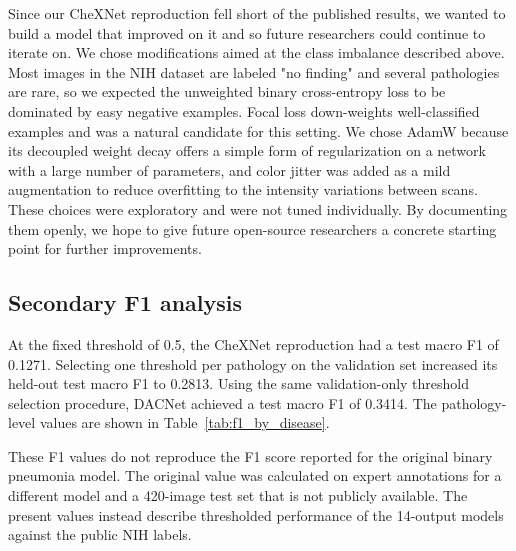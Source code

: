 Since our CheXNet reproduction fell short of the published results, we
wanted to build a model that improved on it and so future researchers
could continue to iterate on. We chose modifications aimed at the class
imbalance described above. Most images in the NIH dataset are labeled "no finding" 
and several pathologies are rare, so we expected the unweighted binary cross-entropy
loss to be dominated by easy negative examples. Focal loss down-weights
well-classified examples and was a natural candidate for this setting. We
chose AdamW because its decoupled weight decay offers a simple form of
regularization on a network with a large number of parameters, and color
jitter was added as a mild augmentation to reduce overfitting to the
intensity variations between scans. These choices were exploratory and
were not tuned individually. By documenting them openly, we hope to give
future open-source researchers a concrete starting point for further
improvements.

\subsection{Secondary F1 analysis}

At the fixed threshold of 0.5, the CheXNet reproduction had a test macro F1 of
0.1271. Selecting one threshold per pathology on the validation set increased
its held-out test macro F1 to 0.2813. Using the same validation-only threshold
selection procedure, DACNet achieved a test macro F1 of 0.3414. The
pathology-level values are shown in Table~\ref{tab:f1_by_disease}.

These F1 values do not reproduce the F1 score reported for the original binary
pneumonia model. The original value was calculated on expert annotations for a
different model and a 420-image test set that is not publicly available. The
present values instead describe thresholded performance of the 14-output
models against the public NIH labels.

